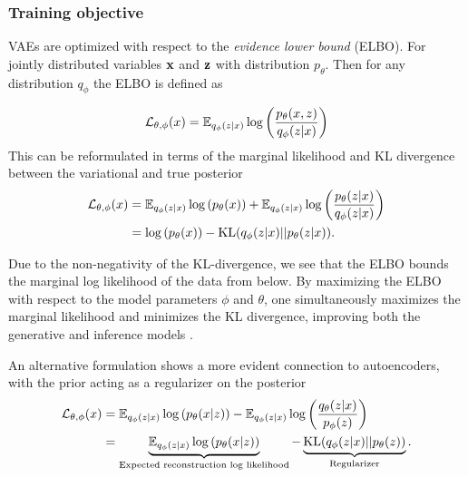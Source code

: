 \documentclass[../../thesis.tex]{subfiles}
\begin{document}
\subsubsection{Training objective}

VAEs are optimized with respect to the \textit{evidence lower bound} (ELBO). For jointly distributed variables $\mathbf{x}$ and $\mathbf{z}$ with distribution $p_\theta$. Then for any distribution $q_\phi$ the ELBO is defined as

\begin{equation}
    \label{eq:ELBO}
    \mathcal{L}_{\theta,\phi}(x) 
    = \mathbb{E}_{q_\phi(z|x)} \log \left( \frac{p_\theta(x,z)}{q_\phi(z|x)}\right)
\end{equation}
This can be reformulated in terms of the marginal likelihood and KL divergence between the variational and true posterior
\begin{equation}
    \begin{aligned}
        \label{eq:ELBO_loglik}
        \mathcal{L}_{\theta,\phi}(x) 
        &=  \mathbb{E}_{q_\phi(z|x)} \log \left( p_\theta(x)\right) + \mathbb{E}_{q_\phi(z|x)} \log \left( \frac{p_\theta(z|x)}{q_\phi(z|x)}\right) \\
        &= \log \left( p_\theta(x)\right) - \textrm{KL}(q_\phi(z|x)|| p_\theta(z|x)).
    \end{aligned}
\end{equation}

Due to the non-negativity of the KL-divergence, we see that the ELBO bounds the marginal log likelihood of the data from below. By maximizing the ELBO with respect to the model parameters $\phi$ and $\theta$,  one simultaneously maximizes the marginal likelihood and minimizes the KL divergence, improving both the generative and inference models \cite{VAE}.\newline

An alternative formulation shows a more evident connection to autoencoders, with the prior acting as a regularizer on the posterior
\begin{equation}
    \begin{aligned}
        \label{eq:ELBO_AE}
        \mathcal{L}_{\theta,\phi}(x) 
        &=  \mathbb{E}_{q_\phi(z|x)} \log \left( p_\theta(x|z)\right) - \mathbb{E}_{q_\phi(z|x)} \log \left( \frac{q_\theta(z|x)}{p_\phi(z)}\right) \\
        &= \underbrace{\mathbb{E}_{q_\phi(z|x)} \log \left( p_\theta(x|z)\right)}_{\text{Expected reconstruction log likelihood}} - \underbrace{\textrm{KL}(q_\phi(z|x)|| p_\theta(z))}_{\text{Regularizer}}.
    \end{aligned}
\end{equation}
\end{document}
